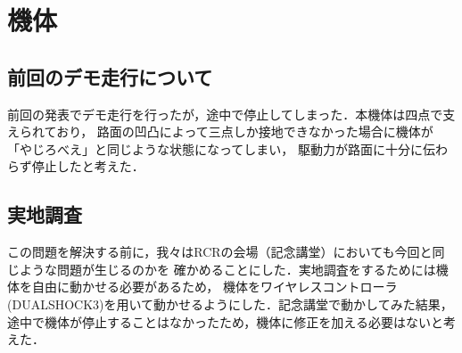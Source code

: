 \documentclass[10pt,a4j]{jarticle}
\begin{document}
\section{機体}
\subsection{前回のデモ走行について}
前回の発表でデモ走行を行ったが，途中で停止してしまった．本機体は四点で支えられており，
路面の凹凸によって三点しか接地できなかった場合に機体が「やじろべえ」と同じような状態になってしまい，
駆動力が路面に十分に伝わらず停止したと考えた．

\subsection{実地調査}
この問題を解決する前に，我々はRCRの会場（記念講堂）においても今回と同じような問題が生じるのかを
確かめることにした．実地調査をするためには機体を自由に動かせる必要があるため，
機体をワイヤレスコントローラ (DUALSHOCK3)を用いて動かせるようにした．記念講堂で動かしてみた結果，
途中で機体が停止することはなかったため，機体に修正を加える必要はないと考えた．
\end{document}

